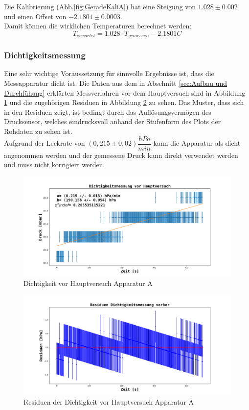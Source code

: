 \documentclass[12pt,a4paper]{article}
\begin{document}
Die Kalibrierung (Abb.\ref{fig:GeradeKaliA}) hat eine Steigung von $1.028\pm 0.002$ und einen Offset von $-2.1801\pm 0.0003$.\\
Damit können die wirklichen Temperaturen berechnet werden:
\begin{equation}
T_{erwartet}=1.028\cdot T_{gemessen}-2.1801C
\end{equation}

\subsubsection{Dichtigkeitsmessung}
Eine sehr wichtige Voraussetzung für sinnvolle Ergebnisse ist, dass die Messapparatur dicht ist. Die Daten aus dem in Abschnitt \ref{sec:Aufbau und Durchfühung} erklärten Messverfahren vor dem Hauptversuch sind in Abbildung \ref{fig:DichtigkeitA} und die zugehörigen Residuen in Abbildung \ref{fig:ResiduenDichtigkeitA} zu sehen. Das Muster, dass sich in den Residuen zeigt, ist bedingt durch das Auflösungsvermögen des Drucksensor, welches eindrucksvoll anhand der Stufenform des Plots der Rohdaten zu sehen ist. \\
Aufgrund der Leckrate von $(0,215 \pm 0,02) \dfrac{hPa}{min}$ kann die Apparatur als dicht angenommen werden und der gemessene Druck kann direkt verwendet werden und muss nicht korrigiert werden.

\begin{figure}
\includegraphics[width=\linewidth]{Bilder/Dichtigkeit_vorher_A.png}
\caption[Dichtigkeit vor Hauptversuch Apparatur A]{Dichtigkeit vor Hauptversuch Apparatur A}
\label{fig:DichtigkeitA}
\end{figure}

\begin{figure}
\includegraphics[width=\linewidth]{Bilder/Residuen_Dichtigkeit_vorher_A.png}
\caption[Dichtigkeit vor Hauptversuch Apparatur A]{Residuen der Dichtigkeit vor Hauptversuch Apparatur A}
\label{fig:ResiduenDichtigkeitA}
\end{figure}
\end{document}
